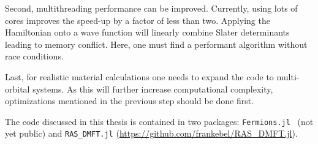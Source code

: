 Second, multithreading performance can be improved.
Currently, using lots of cores improves the speed-up by a factor of less than two.
Applying the Hamiltonian onto a wave function will linearly combine Slater determinants
leading to memory conflict.
Here, one must find a performant algorithm without race conditions.

Last, for realistic material calculations one needs to expand the code to multi-orbital systems.
As this will further increase computational complexity,
optimizations mentioned in the previous step should be done first.

The code discussed in this thesis is contained in two packages:
\texttt{Fermions.jl}~\cite{Wallerberger2022}
(not yet public)
and \texttt{RAS\_DMFT.jl} (\url{https://github.com/frankebel/RAS_DMFT.jl}).
